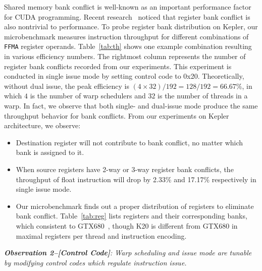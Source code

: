Shared memory bank conflict is well-known as an important performance factor for CUDA programming.
Recent research~\cite{lai} noticed that register bank conflict is also nontrivial to performance.
To probe register bank distribution on Kepler, our microbenchmark measures instruction throughput for different combinations of {\tt FFMA}
register operands.
Table~\ref{tab:th} shows one example combination resulting in various efficiency numbers.
The rightmost column represents the number of register bank conflicts recorded from our experiments.
This experiment is conducted in single issue mode by setting control code to 0x20.
Theoretically, without dual issue, the peak efficiency is $(4\times32)/192=128/192=66.67\%$, in which $4$ is the number of warp schedulers and $32$
is the number of threads in a warp.
In fact, we observe that both single- and dual-issue mode produce the same throughput behavior for bank conflicts.
From our experiments on Kepler architecture, we observe:
\begin{itemize}
\item Destination register will not contribute to bank conflict, no matter which bank is assigned to it.
\item When source registers have 2-way or 3-way register bank conflicts, the throughput of float instruction will drop by 2.33\% and 17.17\% respectively in single issue mode.
\item Our microbenchmark finds out a proper distribution of registers to eliminate bank conflict.
     Table~\ref{tab:reg} lists registers and their corresponding banks, which consistent to GTX680~\cite{lai}, though 
        K20 is different from GTX680 in maximal registers per thread and instruction encoding.

\end{itemize}


{\em {\bf Observation 2--[Control Code]}:
Warp scheduling and issue mode are tunable by modifying control codes which regulate instruction issue.}

